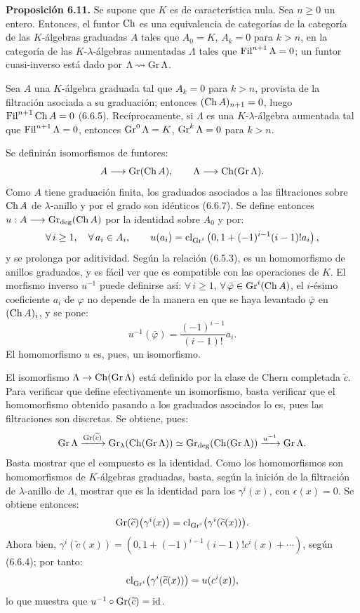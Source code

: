 \textbf{Proposición 6.11.} Se supone que \(K\) es de característica nula. Sea \(n\ge0\) un entero. Entonces, el funtor \(\Ch\) es una equivalencia de categorías de la categoría de las \(K\)-álgebras graduadas \(A\) tales que \(A_0=K\), \(A_k=0\) para \(k>n\), en la categoría de las \(K\)-\(\lambda\)-álgebras aumentadas \(\Lambda\) tales que \(\Fil^{n+1}\Lambda=0\); un funtor cuasi-inverso está dado por \(\Lambda\rightsquigarrow\Gr\Lambda\).

Sea \(A\) una \(K\)-álgebra graduada tal que \(A_k=0\) para \(k>n\), provista de la filtración asociada a su graduación; entonces \((\Ch A)_{n+1}=0\), luego \(\Fil^{n+1}\Ch A=0\) (6.6.5). Recíprocamente, si \(\Lambda\) es una \(K\)-\(\lambda\)-álgebra aumentada tal que \(\Fil^{n+1}\Lambda=0\), entonces \(\Gr^0\Lambda=K\), \(\Gr^k\Lambda=0\) para \(k>n\).

Se definirán isomorfismos de funtores:
\[
  A\longrightarrow \Gr(\Ch A),
  \qquad
  \Lambda\longrightarrow \Ch(\Gr\Lambda).
\]
Como \(A\) tiene graduación finita, los graduados asociados a las filtraciones sobre \(\Ch A\) de \(\lambda\)-anillo y por el grado son idénticos (6.6.7). Se define entonces \(u:A\longrightarrow \Gr_{\deg}(\Ch A)\) por la identidad sobre \(A_0\) y por:
\[
  \forall\, \sisi{i>1}{i\ge1},\quad\forall\, a_i\in A_i,\qquad u(a_i)=\cl_{\Gr^i}\left(0,1+(-1)^{i-1}(i-1)!a_i\right),
\]
y se prolonga por aditividad. Según la relación (6.5.3), es un homomorfismo de anillos graduados, y es fácil ver que es compatible con las operaciones de \(K\). El morfismo inverso \(u^{-1}\) puede definirse así: \(\forall\, i\ge1\), \(\forall\,\bar\varphi\in\Gr^i(\Ch A)\), el \(i\)-ésimo coeficiente \(a_i\) de \(\varphi\) no depende de la manera en que se haya levantado \(\bar\varphi\) en \((\Ch A)_i\), y se pone:
\[
  u^{-1}(\bar\varphi)=\frac{(-1)^{i-1}}{(i-1)!}a_i.
\]
El homomorfismo \(u\) es, pues, un isomorfismo.

El isomorfismo \(\Lambda\to\sisi{\Ch(\Gr\Lambda))}{\Ch(\Gr\Lambda)}\) está definido por la clase de Chern completada \(\widetilde c\). Para verificar que define efectivamente un isomorfismo, basta verificar que el homomorfismo obtenido pasando a los graduados asociados lo es, pues las filtraciones son discretas. Se obtiene, pues:
\[
  \Gr\Lambda
   \xrightarrow{\Gr(\widetilde c)}
  \Gr_{\lambda}(\Ch(\Gr\Lambda))
   \simeq
  \Gr_{\deg}(\Ch(\Gr\Lambda))
   \xrightarrow{u^{-1}}
  \Gr\Lambda .
\]
Basta mostrar que el compuesto es la identidad. Como los homomorfismos son homomorfismos de \(K\)-álgebras graduadas, basta, según la \hphantom{def}inición de la filtración de \(\lambda\)-anillo de \(\Lambda\), mostrar que es la identidad para los \(\gamma^i(x)\), con \(\epsilon(x)=0\). Se obtiene entonces:
\[
  \Gr(\widetilde c)\bigl(\gamma^i(x)\bigr)
  =
  \cl_{\Gr^i}\bigl(\gamma^i(\widetilde c(x))\bigr).
\]
Ahora bien, \(\gamma^i(\widetilde c(x))=(0,1+(-1)^{i-1}(i-1)!c^i(x)+\cdots)\), según (6.6.4); por tanto:
\[
  \cl_{\Gr^i}\bigl(\gamma^i(\widetilde c(x))\bigr)=u(c^i(x)),
\]
lo q\hphantom{u}ue muestra que \(u^{-1}\circ\Gr(\widetilde c)=\id\).

